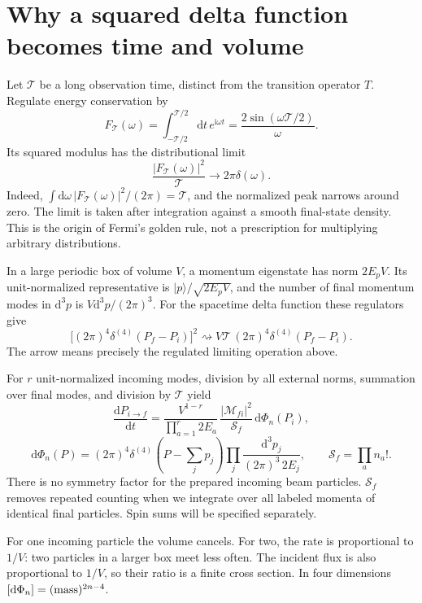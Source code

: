 \documentclass[11pt]{article}
\newcommand{\dd}{\mathrm d}
\newcommand{\ii}{\mathrm i}
\newcommand{\ket}[1]{\lvert#1\rangle}
\newcommand{\module}[1]{\clearpage\section{#1}}
\newcommand{\cM}{\mathcal M}
\newcommand{\cS}{\mathcal S}
\begin{document}
\module{Why a squared delta function becomes time and volume}
Let \(\mathcal T\) be a long observation time, distinct from the transition
operator \(T\). Regulate energy conservation by
\begin{equation}
 F_{\mathcal T}(\omega)=\int_{-\mathcal T/2}^{\mathcal T/2}\dd t\,
 e^{\ii\omega t}=\frac{2\sin(\omega\mathcal T/2)}{\omega}.
\end{equation}
Its squared modulus has the distributional limit
\begin{equation}
 \frac{|F_{\mathcal T}(\omega)|^2}{\mathcal T}
 \longrightarrow 2\pi\delta(\omega).
 \label{eq:golden}
\end{equation}
Indeed, \(\int\dd\omega\,|F_{\mathcal T}(\omega)|^2/(2\pi)=\mathcal T\),
and the normalized peak narrows around zero. The limit is taken after
integration against a smooth final-state density. This is the origin of
Fermi's golden rule, not a prescription for multiplying arbitrary distributions.

In a large periodic box of volume \(V\), a momentum eigenstate has norm
\(2E_pV\). Its unit-normalized representative is \(\ket{p}/\sqrt{2E_pV}\),
and the number of final momentum modes in \(\dd^3p\) is
\(V\dd^3p/(2\pi)^3\). For the spacetime delta function these regulators give
\begin{equation}
 \big[(2\pi)^4\delta^{(4)}(P_f-P_i)\big]^2
 \rightsquigarrow V\mathcal T\,(2\pi)^4\delta^{(4)}(P_f-P_i).
\end{equation}
The arrow means precisely the regulated limiting operation above.

For \(r\) unit-normalized incoming modes, division by all external norms,
summation over final modes, and division by \(\mathcal T\) yield
\begin{equation}
 \frac{\dd P_{i\to f}}{\dd t}
 =\frac{V^{1-r}}{\prod_{a=1}^{r}2E_a}\,
 \frac{|\cM_{fi}|^2}{\cS_f}\,\dd\Phi_n(P_i),
 \label{eq:master}
\end{equation}
\begin{equation}
 \dd\Phi_n(P)=(2\pi)^4\delta^{(4)}\!\left(P-\sum_jp_j\right)
 \prod_j\frac{\dd^3p_j}{(2\pi)^3\,2E_j},\qquad
 \cS_f=\prod_a n_a!.
\end{equation}
There is no symmetry factor for the prepared incoming beam particles.
\(\cS_f\) removes repeated counting when we integrate over all labeled
momenta of identical final particles. Spin sums will be specified separately.

\begin{remarkbox}
For one incoming particle the volume cancels. For two, the rate is
proportional to \(1/V\): two particles in a larger box meet less often.
The incident flux is also proportional to \(1/V\), so their ratio is a
finite cross section. In four dimensions \([\dd\Phi_n]=({\rm mass})^{2n-4}\).
\end{remarkbox}
\end{document}
